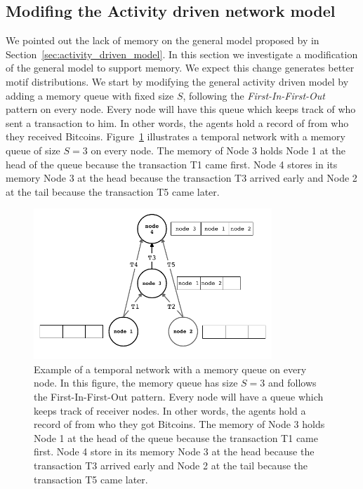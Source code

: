 \documentclass[../../thesis.tex]{subfiles}
\begin{document}
\subsection{Modifing the Activity driven network model}
\label{sec:modifing_activity_driven_model}



We pointed out the lack of memory on the general model proposed by \cite{perra2012activity} in Section~\ref{sec:activity_driven_model}. In this section we investigate a modification of the general model to support memory. We expect this change generates better motif distributions. We start by modifying the general activity driven model by adding a memory queue with fixed size $S$, following the \textit{First-In-First-Out} pattern on every node. Every node will have this queue which keeps track of who sent a transaction to him. In other words, the agents hold a record of from who they received Bitcoins. Figure~\ref{fig:proposed_model_queue_example} illustrates a temporal network with a memory queue of size $S=3$ on every node. The memory of Node 3 holds Node 1 at the head of the queue because the transaction T1 came first. Node 4 stores in its memory Node 3 at the head because the transaction T3 arrived early and Node 2 at the tail because the transaction T5 came later.


\begin{figure}
\centering
\includegraphics[width=0.8\textwidth]{content/modelling/img/proposed_model_queue_example}
\caption{Example of a temporal network with a memory queue on every node. In this figure, the memory queue has size $S=3$ and follows the First-In-First-Out pattern. Every node will have a queue which keeps track of receiver nodes. In other words, the agents hold a record of from who they got Bitcoins. The memory of Node 3 holds Node 1 at the head of the queue because the transaction T1 came first.  Node 4 store in its memory Node 3 at the head because the transaction T3 arrived early and Node 2 at the tail because the transaction T5 came later.}
\label{fig:proposed_model_queue_example}
\end{figure}
\end{document}
